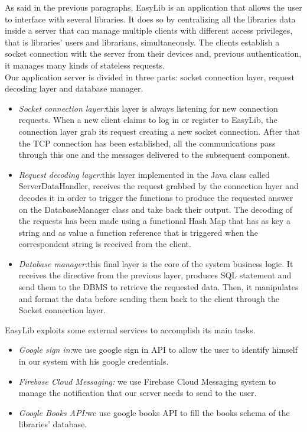 \newpage
{}
As said in the previous paragraphs, EasyLib is an application that allows the user to interface with several libraries. It does so by centralizing all the libraries data inside a server that can manage multiple clients with different access privileges, that is libraries’ users and librarians, simultaneously. The clients establish a socket connection with the server from their devices and, previous authentication, it manages many kinds of stateless requests. \\
Our application server is divided in three parts: socket connection layer, request decoding layer and database manager.

\begin{itemize}
\item \emph{Socket connection layer:}this layer is always listening for new connection requests. When a new client claims to log in or register to EasyLib, the connection layer grab its request creating a new socket connection. After that the TCP connection has been established, all the communications pass through this one and the messages delivered to the subsequent component.
\item \emph{Request decoding layer:}this layer implemented in the Java class called ServerDataHandler, receives the request grabbed by the connection layer and decodes it in order to trigger the functions to produce the requested answer on the DatabaseManager class and take back their output. The decoding of the requests has been made using a functional Hash Map that has as key a string and as value a function reference that is triggered when the correspondent string is received from the client.
\item \emph{Database manager:}this final layer is the core of the system business logic. It receives the directive from the previous layer, produces SQL statement and send them to the DBMS to retrieve the requested data. Then, it manipulates and format the data before sending them back to the client through the Socket connection layer.
\end{itemize}


EasyLib exploits some external services to accomplish its main tasks.

\begin{itemize}
\item \emph{Google sign in:}we use google sign in API to allow the user to identify himself in our system with his google credentials.
\item \emph{Firebase Cloud Messaging: } we use Firebase Cloud Messaging system to manage the notification that our server needs to send to the user.
\item \emph{Google Books API:}we use google books API to fill the books schema of the libraries’ database.\\
\end{itemize}

